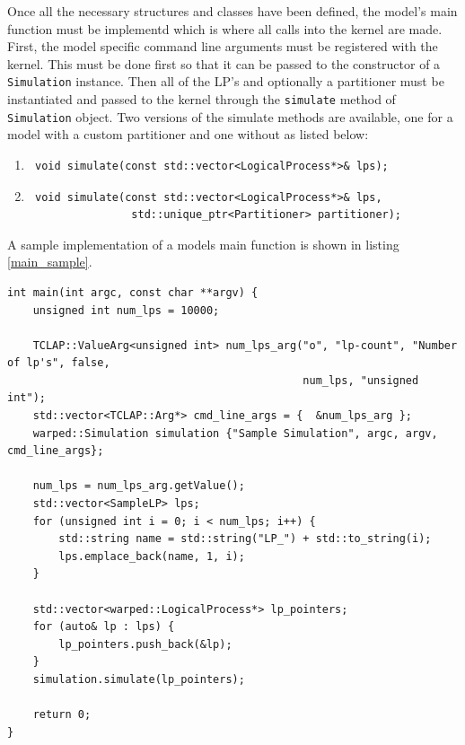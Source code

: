 \documentclass[11pt]{book}
\begin{document}
Once all the necessary structures and classes have been defined, the model's main function
must be implementd which is where all calls into the kernel are made. First, the model
specific command line arguments must be registered with the kernel. This must be done first
so that it can be passed to the constructor of a \texttt{Simulation} instance. Then all of
the LP's and optionally a partitioner must be instantiated and passed to the kernel through
the \texttt{simulate} method of \texttt{Simulation} object. Two versions of the simulate
methods are available, one for a model with a custom partitioner and one without as listed below:

\begin{enumerate}
    \item \begin{verbatim} void simulate(const std::vector<LogicalProcess*>& lps); \end{verbatim}
    \item \begin{verbatim} void simulate(const std::vector<LogicalProcess*>& lps,
                std::unique_ptr<Partitioner> partitioner); \end{verbatim}
\end{enumerate}

\noindent
A sample implementation of a models main function is shown in listing \ref{main_sample}.

\begin{lstlisting}[caption=Sample \textsc{warped2} Main Definition, label=main_sample, float]
int main(int argc, const char **argv) {
    unsigned int num_lps = 10000;

    TCLAP::ValueArg<unsigned int> num_lps_arg("o", "lp-count", "Number of lp's", false,
                                              num_lps, "unsigned int");
    std::vector<TCLAP::Arg*> cmd_line_args = {  &num_lps_arg };
    warped::Simulation simulation {"Sample Simulation", argc, argv, cmd_line_args};

    num_lps = num_lps_arg.getValue();
    std::vector<SampleLP> lps;
    for (unsigned int i = 0; i < num_lps; i++) {
        std::string name = std::string("LP_") + std::to_string(i);
        lps.emplace_back(name, 1, i);
    }

    std::vector<warped::LogicalProcess*> lp_pointers;
    for (auto& lp : lps) {
        lp_pointers.push_back(&lp);
    }
    simulation.simulate(lp_pointers);

    return 0;
}
\end{lstlisting}
\end{document}

